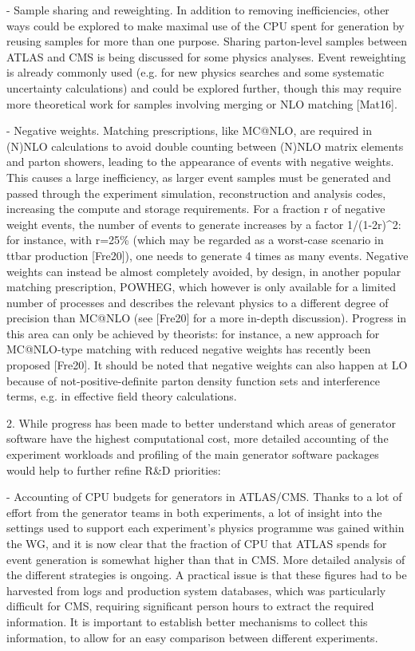 \documentclass[11pt,a4paper]{article}
\begin{document}
- {Sample sharing and reweighting}. In addition to removing
inefficiencies, other ways could be explored to make maximal use of the
CPU spent for generation by reusing samples for more than one purpose.
Sharing parton-level samples between ATLAS and CMS is being discussed
for some physics analyses. Event reweighting is already commonly used
(e.g. for new physics searches and some systematic uncertainty
calculations) and could be explored further, though this may require
more theoretical work for samples involving merging or NLO matching
{[}Mat16{]}.

- {Negative weights}. Matching prescriptions, like MC@NLO, are required
in (N)NLO calculations to avoid double counting between (N)NLO matrix
elements and parton showers, leading to the appearance of events with
negative weights. This causes a large inefficiency, as larger event
samples must be generated and passed through the experiment simulation,
reconstruction and analysis codes, increasing the compute and storage
requirements. For a fraction r of negative weight events, the number of
events to generate increases by a factor 1/(1-2r)\^{}2: for instance,
with r=25\% (which may be regarded as a worst-case scenario in ttbar
production {[}Fre20{]}), one needs to generate 4 times as many events.
Negative weights can instead be almost completely avoided, by design, in
another popular matching prescription, POWHEG, which however is only
available for a limited number of processes and describes the relevant
physics to a different degree of precision than MC@NLO (see {[}Fre20{]}
for a more in-depth discussion). Progress in this area can only be
achieved by theorists: for instance, a new approach for MC@NLO-type
matching with reduced negative weights has recently been proposed
{[}Fre20{]}. It should be noted that negative weights can also happen at
LO because of not-positive-definite parton density function sets and
interference terms, e.g. in effective field theory calculations.

2. While progress has been made to better understand which areas of
generator software have the highest computational cost, more detailed
accounting of the experiment workloads and profiling of the main
generator software packages would help to further refine R\&D
priorities:

- {Accounting of CPU budgets for generators in ATLAS/CMS}. Thanks to a
lot of effort from the generator teams in both experiments, a lot of
insight into the settings used to support each experiment's physics
programme was gained within the WG, and it is now clear that the
fraction of CPU that ATLAS spends for event generation is somewhat
higher than that in CMS. More detailed analysis of the different
strategies is ongoing. A practical issue is that these figures had to be
harvested from logs and production system databases, which was
particularly difficult for CMS, requiring significant person hours to
extract the required information. It is important to establish better
mechanisms to collect this information, to allow for an easy comparison
between different experiments.
\end{document}
